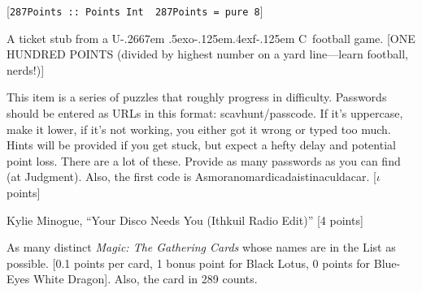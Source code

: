 \documentclass{book}
\def\UofC{U\kern-.2667em \lower.5ex\hbox{o}\kern-.125em\raise.4ex\hbox{f}\kern-.125em C}
\begin{document}
\begin{list}{}{}
[\texttt{287Points :: Points Int \
	287Points = pure 8}] \textleaf
\item A ticket stub from a \UofC\ football game. [ONE HUNDRED POINTS (divided by highest number on a yard line---learn football, nerds!)]
\item This item is a series of puzzles that roughly progress in difficulty. Passwords should be entered as URLs in this format: scavhunt/passcode. If it’s uppercase, make it lower, if it’s not working, you either got it wrong or typed too much. Hints will be provided if you get stuck, but expect a hefty delay and potential point loss. There are a lot of these. Provide as many passwords as you can find (at Judgment). Also, the first code is Asmoranomardicadaistinaculdacar. [$\iota$ points]
\item Kylie Minogue, “Your Disco Needs You (Ithkuil Radio Edit)” [4 points] \textleaf
\item As many distinct \textit{Magic: The Gathering Cards} whose names are in the List as possible. [0.1 points per card, 1 bonus point for Black Lotus, 0 points for Blue-Eyes White Dragon]. Also, the card in 289 counts.
\end{list}
\end{document}
